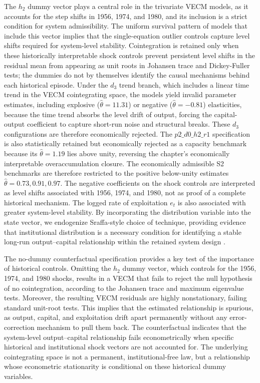 \documentclass[11pt]{article}
\begin{document}
The $h_2$ dummy vector plays a central role in the trivariate VECM models, as it accounts for the step shifts in 1956, 1974, and 1980, and its inclusion is a strict condition for system admissibility. The uniform survival pattern of models that include this vector implies that the single-equation outlier controls capture level shifts required for system-level stability. Cointegration is retained only when these historically interpretable shock controls prevent persistent level shifts in the residual mean from appearing as unit roots in Johansen trace and Dickey-Fuller tests; the dummies do not by themselves identify the causal mechanisms behind each historical episode. Under the $d_3$ trend branch, which includes a linear time trend in the VECM cointegrating space, the models yield invalid parameter estimates, including explosive ($\hat{\theta} = 11.31$) or negative ($\hat{\theta} = -0.81$) elasticities, because the time trend absorbs the level drift of output, forcing the capital-output coefficient to capture short-run noise and structural breaks. These $d_3$ configurations are therefore economically rejected. The $p2\_d0\_h2\_r1$ specification is also statistically retained but economically rejected as a capacity benchmark because its $\hat{\theta}=1.19$ lies above unity, reversing the chapter's economically interpretable overaccumulation closure. The economically admissible S2 benchmarks are therefore restricted to the positive below-unity estimates $\hat{\theta}=0.73, 0.91, 0.97$. The negative coefficients on the shock controls are interpreted as level shifts associated with 1956, 1974, and 1980, not as proof of a complete historical mechanism. The logged rate of exploitation $e_t$ is also associated with greater system-level stability. By incorporating the distribution variable into the state vector, we endogenize Sraffa-style choice of technique, providing evidence that institutional distribution is a necessary condition for identifying a stable long-run output--capital relationship within the retained system design \citep{Kurz1986}.

The no-dummy counterfactual specification provides a key test of the importance of historical controls. Omitting the $h_2$ dummy vector, which controls for the 1956, 1974, and 1980 shocks, results in a VECM that fails to reject the null hypothesis of no cointegration, according to the Johansen trace and maximum eigenvalue tests. Moreover, the resulting VECM residuals are highly nonstationary, failing standard unit-root tests. This implies that the estimated relationship is spurious, as output, capital, and exploitation drift apart permanently without any error-correction mechanism to pull them back. The counterfactual indicates that the system-level output--capital relationship fails econometrically when specific historical and institutional shock vectors are not accounted for. The underlying cointegrating space is not a permanent, institutional-free law, but a relationship whose econometric stationarity is conditional on these historical dummy variables.
\end{document}
